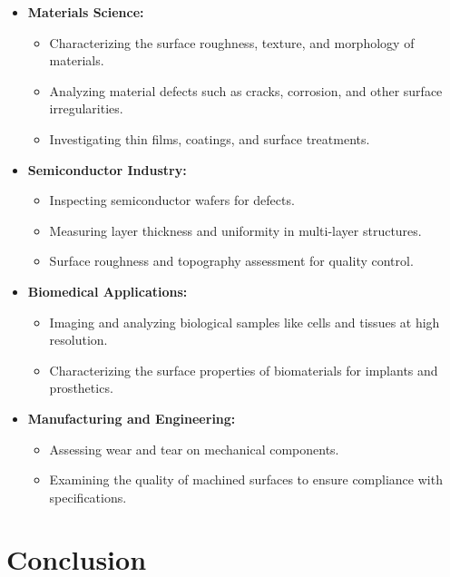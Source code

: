 \documentclass[11pt]{article}
\begin{document}
	\begin{itemize}
		\item \textbf{Materials Science:}
		\begin{itemize}
			\item Characterizing the surface roughness, texture, and morphology of materials.
			\item Analyzing material defects such as cracks, corrosion, and other surface irregularities.
			\item Investigating thin films, coatings, and surface treatments.
		\end{itemize}
		
		\item \textbf{Semiconductor Industry:}
		\begin{itemize}
			\item Inspecting semiconductor wafers for defects.
			\item Measuring layer thickness and uniformity in multi-layer structures.
			\item Surface roughness and topography assessment for quality control.
		\end{itemize}
		
		\item \textbf{Biomedical Applications:}
		\begin{itemize}
			\item Imaging and analyzing biological samples like cells and tissues at high resolution.
			\item Characterizing the surface properties of biomaterials for implants and prosthetics.
		\end{itemize}
		
		\item \textbf{Manufacturing and Engineering:}
		\begin{itemize}
			\item Assessing wear and tear on mechanical components.
			\item Examining the quality of machined surfaces to ensure compliance with specifications.
		\end{itemize}
	\end{itemize}
	
	
\clearpage
	
	\section{Conclusion}
		
\end{document}
